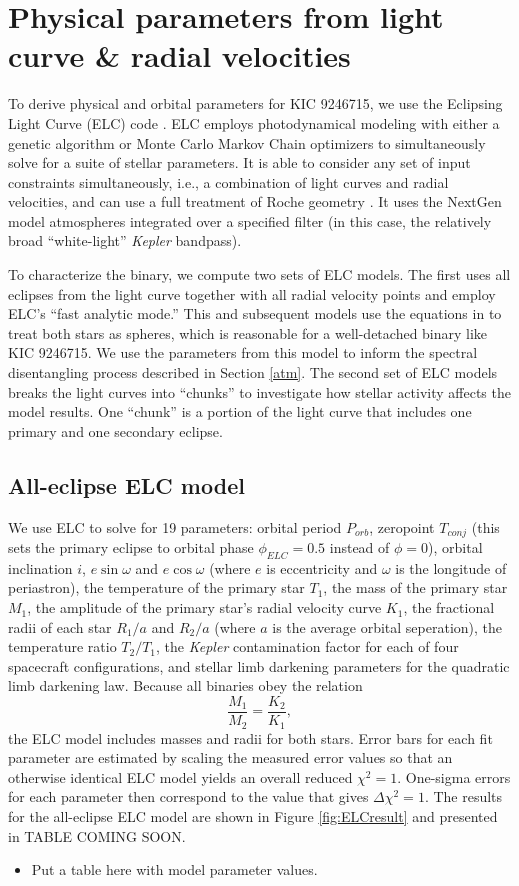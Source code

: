 \section{Physical parameters from light curve \& radial velocities}\label{model}
To derive physical and orbital parameters for KIC 9246715, we use the Eclipsing Light Curve (ELC) code \citep{oro00}. ELC employs photodynamical modeling with either a genetic algorithm or Monte Carlo Markov Chain optimizers to simultaneously solve for a suite of stellar parameters. It is able to consider any set of input constraints simultaneously, i.e., a combination of light curves and radial velocities, and can use a full treatment of Roche geometry \citep{kop69,avn75}. It uses the NextGen model atmospheres integrated over a specified filter (in this case, the relatively broad ``white-light'' \emph{Kepler} bandpass).

To characterize the binary, we compute two sets of ELC models. The first uses all eclipses from the light curve together with all radial velocity points and employ ELC's ``fast analytic mode.'' This and subsequent models use the equations in \citet{man02} to treat both stars as spheres, which is reasonable for a well-detached binary like KIC 9246715. We use the parameters from this model to inform the spectral disentangling process described in Section \ref{atm}. The second set of ELC models breaks the light curves into ``chunks'' to investigate how stellar activity affects the model results. One ``chunk'' is a portion of the light curve that includes one primary and one secondary eclipse.

\subsection{All-eclipse ELC model}

We use ELC to solve for 19 parameters: orbital period $P_{orb}$, zeropoint $T_{conj}$ (this sets the primary eclipse to orbital phase $\phi_{ELC} = 0.5$ instead of $\phi = 0$), orbital inclination $i$, $e \sin \omega$ and $e \cos \omega$ (where $e$ is eccentricity and $\omega$ is the longitude of periastron), the temperature of the primary star $T_1$, the mass of the primary star $M_1$, the amplitude of the primary star's radial velocity curve $K_1$, the fractional radii of each star $R_1/a$ and $R_2/a$ (where $a$ is the average orbital seperation), the temperature ratio $T_2/T_1$, the \emph{Kepler} contamination factor for each of four spacecraft configurations, and stellar limb darkening parameters for the quadratic limb darkening law. Because all binaries obey the relation
\begin{equation}
\frac{M_1}{M_2} = \frac{K_2}{K_1},
\end{equation}
the ELC model includes masses and radii for both stars. Error bars for each fit parameter are estimated by scaling the measured error values so that an otherwise identical ELC model yields an overall reduced $\chi^2 = 1$. One-sigma errors for each parameter then correspond to the value that gives $\Delta \chi^2 = 1$. The results for the all-eclipse ELC model are shown in Figure \ref{fig:ELCresult} and presented in TABLE COMING SOON.

\begin{itemize}
\item Put a table here with model parameter values.
\end{itemize}

